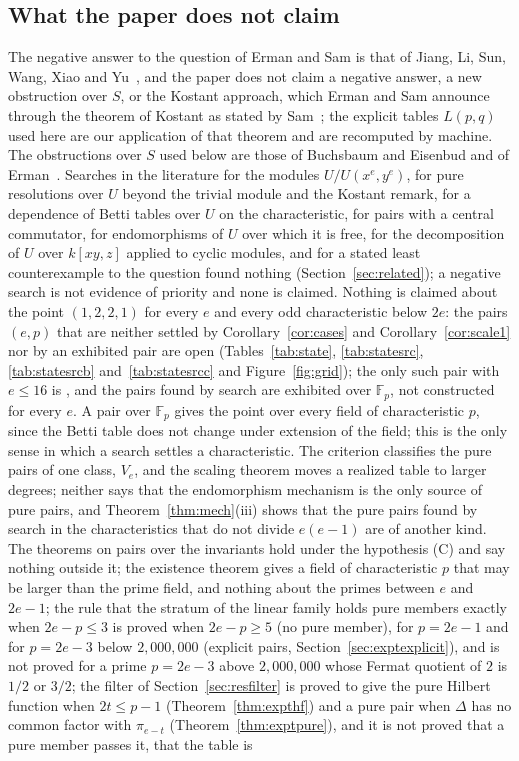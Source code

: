 \documentclass[11pt]{article}
\theoremstyle{definition}
\theoremstyle{remark}
\newcommand{\F}{\mathbb{F}}
\begin{document}
\subsection{What the paper does not claim}

The negative answer to the question of Erman and Sam is that of Jiang, Li, Sun, Wang, Xiao and Yu~\cite{JLSWXY}, and the paper does not claim a negative answer, a new obstruction over $S$, or the Kostant approach, which Erman and Sam announce~\cite[Section~6]{ES16} through the theorem of Kostant as stated by Sam~\cite[Theorem~2.1 and Section~2.2]{Sam15}; the explicit tables $L(p,q)$ used here are our application of that theorem and are recomputed by machine. The obstructions over $S$ used below are those of Buchsbaum and Eisenbud and of Erman~\cite{BE77,BE74,Erman09}. Searches in the literature for the modules $U/U(x^e,y^e)$, for pure resolutions over $U$ beyond the trivial module and the Kostant remark, for a dependence of Betti tables over $U$ on the characteristic, for pairs with a central commutator, for endomorphisms of $U$ over which it is free, for the decomposition of $U$ over $k[xy,z]$ applied to cyclic modules, and for a stated least counterexample to the question found nothing (Section~\ref{sec:related}); a negative search is not evidence of priority and none is claimed. Nothing is claimed about the point $(1,2,2,1)$ for every $e$ and every odd characteristic below $2e$: the pairs $(e,p)$ that are neither settled by Corollary~\ref{cor:cases} and Corollary~\ref{cor:scale1} nor by an exhibited pair are open (Tables~\ref{tab:state}, \ref{tab:statesrc}, \ref{tab:statesrcb} and~\ref{tab:statesrcc} and Figure~\ref{fig:grid}); the only such pair with $e\le16$ is \ngridOpenListSixteen{}, and the pairs found by search are exhibited over $\F_p$, not constructed for every $e$. A pair over $\F_p$ gives the point over every field of characteristic $p$, since the Betti table does not change under extension of the field; this is the only sense in which a search settles a characteristic. The criterion classifies the pure pairs of one class, $V_e$, and the scaling theorem moves a realized table to larger degrees; neither says that the endomorphism mechanism is the only source of pure pairs, and Theorem~\ref{thm:mech}(iii) shows that the pure pairs found by search in the characteristics that do not divide $e(e-1)$ are of another kind. The theorems on pairs over the invariants hold under the hypothesis (C) and say nothing outside it; the existence theorem gives a field of characteristic $p$ that may be larger than the prime field, and nothing about the primes between $e$ and $2e-1$; the rule that the stratum of the linear family holds pure members exactly when $2e-p\le3$ is proved when $2e-p\ge5$ (no pure member), for $p=2e-1$ and for $p=2e-3$ below $2{,}000{,}000$ (explicit pairs, Section~\ref{sec:exptexplicit}), and is not proved for a prime $p=2e-3$ above $2{,}000{,}000$ whose Fermat quotient of $2$ is $1/2$ or $3/2$; the filter of Section~\ref{sec:resfilter} is proved to give the pure Hilbert function when $2t\le p-1$ (Theorem~\ref{thm:expthf}) and a pure pair when $\Delta$ has no common factor with $\pi_{e-t}$ (Theorem~\ref{thm:exptpure}), and it is not proved that a pure member passes it, that the table is 
\end{document}
